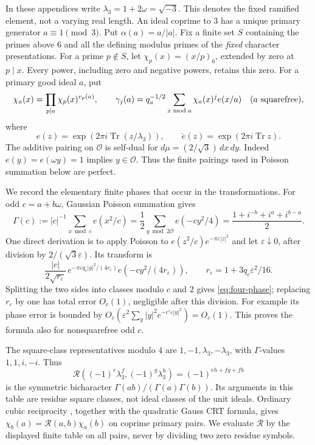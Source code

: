 \documentclass[12pt]{article}
\begin{document}
In these appendices write \(\lambda_3=1+2\omega=\sqrt{-3}\).
This denotes the fixed ramified element, not a varying real length.
An ideal coprime to \(3\) has a unique primary generator
\(a\equiv1\pmod3\).  Put \(\alpha(a)=a/|a|\).  Fix a finite set
\(S\) containing the primes above \(6\) and all the defining
modulus primes of the \emph{fixed} character presentations.
For a prime \(p\notin S\), let
\(\chi_p(x)=(x/p)_6\), extended by zero at \(p\mid x\).
Every power, including zero and negative powers, retains this zero.
For a primary good ideal \(a\), put
\[
 \chi_a(x)=\prod_{p\mid a}\chi_p(x)^{v_p(a)},\qquad
 \gamma_j(a)=q_a^{-1/2}\sum_{x\bmod a}\chi_a(x)^j e(x/a)
 \quad(a\ {\rm squarefree}),
\]
where
\[
 e(z)=\exp(2\pi i\operatorname{Tr}(z/\lambda_3)),\qquad
 \check e(z)=\exp(2\pi i\operatorname{Tr}z).
\]
The additive pairing on \(\mathcal O\) is self-dual for
\(d\mu=(2/\sqrt3)\,dx\,dy\).
Indeed \(e(y)=e(\omega y)=1\) implies \(y\in\mathcal O\).
Thus the finite pairings used in Poisson summation below are perfect.

We record the elementary finite phases that occur in the transformations.
For odd \(c=a+b\omega\), Gaussian Poisson summation gives
\[
 \Gamma(c):=|c|^{-1}\sum_{x\bmod c}e(x^2/c)
 =\frac12\sum_{y\bmod2\mathcal O}e(-cy^2/4)
 =\frac{1+i^{-b}+i^a+i^{b-a}}2.
 \tag{A1}\label{eq:four-phase}
\]
One direct derivation is to apply Poisson to
\(e(z^2/c)e^{-\pi\varepsilon|z|^2}\) and let
\(\varepsilon\downarrow0\), after division by
\(2/(\sqrt3\varepsilon)\).
Its transform is
\[
 \frac{|c|}{2\sqrt{r_\varepsilon}}\,
 e^{-\pi\varepsilon q_c|y|^2/(4r_\varepsilon)}
 e(-cy^2/(4r_\varepsilon)),\qquad
 r_\varepsilon=1+3q_c\varepsilon^2/16.
\]
Splitting the two sides into classes modulo \(c\) and \(2\)
gives \eqref{eq:four-phase}; replacing \(r_\varepsilon\) by one
has total error \(O_c(1)\), negligible after this division.
For example its phase error is bounded by
\(O_c(\varepsilon^2\sum_y|y|^2e^{-c'\varepsilon|y|^2})=O_c(1)\).
This proves the formula also for nonsquarefree odd \(c\).

The square-class representatives modulo \(4\) are
\(1,-1,\lambda_3,-\lambda_3\), with \(\Gamma\)-values
\(1,1,i,-i\).  Thus
\[
 \mathcal R((-1)^e\lambda_3^f,(-1)^g\lambda_3^h)
       =(-1)^{eh+fg+fh}
\]
is the symmetric bicharacter
\(\Gamma(ab)/(\Gamma(a)\Gamma(b))\).
Its arguments in this table are residue square classes, not
ideal classes of the unit ideals.
Ordinary cubic reciprocity \cite[(1.4)]{DR}, together with the
quadratic Gauss CRT formula, gives
\(\chi_b(a)=\mathcal R(a,b)\chi_a(b)\) on coprime primary pairs.
We evaluate \(\mathcal R\) by the displayed finite table on all
pairs, never by dividing two zero residue symbols.
\end{document}
